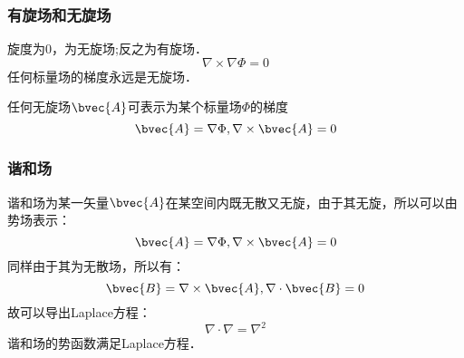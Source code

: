 \subsubsection{有旋场和无旋场}
旋度为0，为无旋场;反之为有旋场．
\begin{equation}\label{VecAnl_eq26}
\nabla\times\nabla\Phi=0
\end{equation}
任何标量场的梯度永远是无旋场．

任何无旋场$\bvec{A}$可表示为某个标量场$\Phi$的梯度
\begin{equation}\label{VecAnl_eq27}
\bvec{A}=\nabla\Phi,\nabla\times\bvec{A}=0
\end{equation}

\subsubsection{谐和场}
谐和场为某一矢量$\bvec{A}$在某空间内既无散又无旋，由于其无旋，所以可以由势场表示：
\begin{equation}\label{VecAnl_eq28}
\bvec{A}=\nabla\Phi,\nabla\times\bvec{A}=0
\end{equation}
同样由于其为无散场，所以有：
\begin{equation}\label{VecAnl_eq29}
\bvec{B}=\nabla\times\bvec{A} ,\nabla\cdot\bvec{B}=0
\end{equation}
故可以导出Laplace方程：
\begin{equation}\label{VecAnl_eq30}
\nabla\cdot\nabla=\nabla^2
\end{equation}
谐和场的势函数满足Laplace方程．
